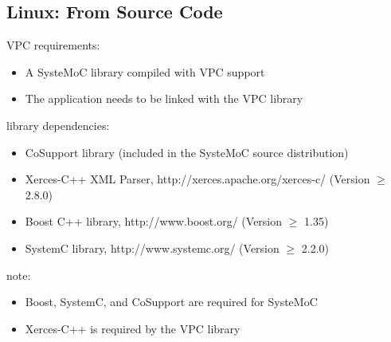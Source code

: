 \subsection{Linux: From Source Code}

\begin{frame}[t]
VPC requirements:
\begin{itemize}
\item A SysteMoC library compiled with VPC support
\item The application needs to be linked with the VPC library
\end{itemize}
library dependencies:
\begin{itemize}
\item CoSupport library (included in the SysteMoC source distribution)
\item Xerces-C++ XML Parser, http://xerces.apache.org/xerces-c/ (Version $\ge$ 2.8.0)
\item Boost C++ library, http://www.boost.org/ (Version $\ge$ 1.35)
\item SystemC library, http://www.systemc.org/ (Version $\ge$ 2.2.0)
\end{itemize}
note:
\begin{itemize}
\item Boost, SystemC, and CoSupport are required for SysteMoC
\item Xerces-C++ is required by the VPC library
\end{itemize}

\end{frame}

